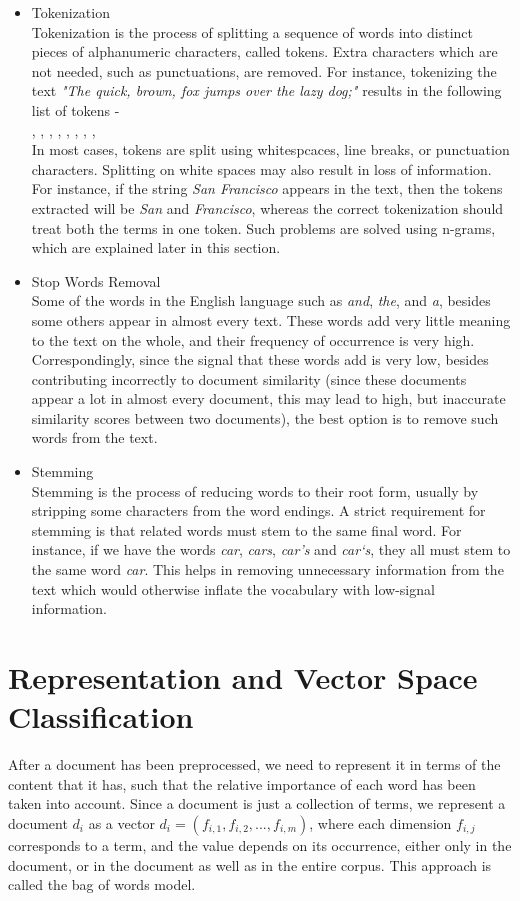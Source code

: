 \begin{itemize}
    \item{
    Tokenization\\
    Tokenization is the process of splitting a sequence of words into distinct pieces of alphanumeric characters, called tokens. Extra characters which are not needed, such as punctuations, are removed. For instance, tokenizing the text \emph{"The quick, brown, fox jumps over the lazy dog;"} results in the following list of tokens - \\
    , , , , , , , , \\
    In most cases, tokens are split using whitespcaces, line breaks, or punctuation characters. Splitting on white spaces may also result in loss of information. For instance, if the string \emph{San Francisco} appears in the text, then the tokens extracted will be \emph{San} and \emph{Francisco}, whereas the correct tokenization should treat both the terms in one token. Such problems are solved using n-grams, which are explained later in this section.
    }
    \item{
    Stop Words Removal\\
    Some of the words in the English language such as \emph{and}, \emph{the}, and \emph{a}, besides some others appear in almost every text. These words add very little meaning to the text on the whole, and their frequency of occurrence is very high. Correspondingly, since the signal that these words add is very low, besides contributing incorrectly to document similarity (since these documents appear a lot in almost every document, this may lead to high, but inaccurate similarity scores between two documents), the best option is to remove such words from the text.
    }
    \item{
    Stemming\\
    Stemming is the process of reducing words to their root form, usually by stripping some characters from the word endings. A strict requirement for stemming is that related words must stem to the same final word. For instance, if we have the words \emph{car}, \emph{cars}, \emph{car's} and \emph{car`s}, they all must stem to the same word \emph{car}. This helps in removing unnecessary information from the text which would otherwise inflate the vocabulary with low-signal information.
    }
\end{itemize}

\section{Representation and Vector Space Classification}
After a document has been preprocessed, we need to represent it in terms of the content that it has, such that the relative importance of each word has been taken into account. Since a document is just a collection of terms, we represent a document $d_{i}$ as a vector $d_{i} = (f_{i, 1}, f_{i, 2}, ... , f_{i, m})$, where each dimension $f_{i, j}$ corresponds to a term, and the value depends on its occurrence, either only in the document, or in the document as well as in the entire corpus. This approach is called the bag of words model.

